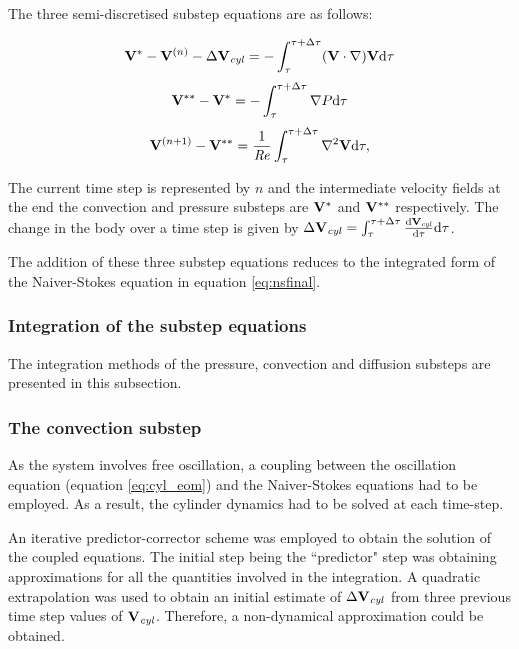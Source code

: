  The three semi-discretised substep equations are as follows:
 
\begin{equation} \centering
\label{eq:substep1}
\Vint - \Vn - \Delta\Vcyl = -\int_{\tau}^{\tau+\Delta\tau}(\vecV\cdot\nabla)\vecV \mathrm{d}\tau
\end{equation}
\begin{equation} \centering
\label{eq:substep2}
\Vintint - \Vint = -\int_{\tau}^{\tau+\Delta\tau}\nabla\Pres \mathrm{d}\tau
\end{equation}
\begin{equation} \centering
\label{eq:substep3}
\Vnext-\Vintint = \frac{1}{\Rey}\int_{\tau}^{\tau+\Delta\tau}\gradsq{\vecV} \mathrm{d}\tau,
\end{equation} 
 
The current time step is represented by $n$ and the intermediate velocity fields at the end the convection and pressure substeps are $\mathbf{V}^{*}$ and $\mathbf{V}^{**}$ respectively. The change in the body over a time step is given by $\Delta\mathbf{V}_{\mathit{cyl}} =
\int_{\tau}^{\tau+\Delta\tau}\frac{\mathrm{d}\mathbf{V}_{\mathit{cyl}}}{\mathrm{d}\tau} \mathrm{d}\tau$. 

The addition of these three substep equations reduces to the integrated form of the Naiver-Stokes equation in equation \ref{eq:nsfinal}. 

\subsubsection{Integration of the substep equations}
\label{subsec:sol}
 
 The integration methods of the pressure, convection and diffusion substeps are presented in this subsection. 
 
 \subsubsection{The convection substep}
 \label{subsub:convec}
 
As the system involves free oscillation, a coupling between the oscillation equation (equation \ref{eq:cyl_eom}) and the Naiver-Stokes equations had to be employed. As a result, the cylinder dynamics had to be solved at each time-step.

An iterative predictor-corrector scheme was employed to obtain the solution of the coupled equations. The initial step being the ``predictor" step was obtaining approximations for all the quantities involved in  the integration. A quadratic extrapolation was used to obtain an initial estimate of $\Delta\mathbf{V}_{\mathit{cyl}}$ from  three previous time step values of $\mathbf{V}_{\mathit{cyl}}$. Therefore, a non-dynamical approximation could be obtained.  
 
